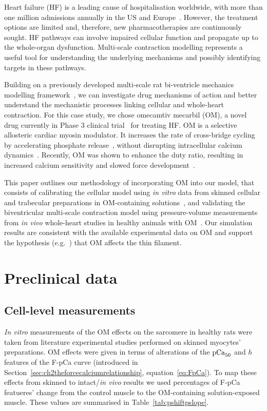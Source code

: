 \vspace{0.2cm}
Heart failure (HF) is a leading cause of hospitalisation worldwide, with more than one million admissions annually in the US and Europe~\cite{Benjamin:2018}. However, the treatment options are limited and, therefore, new pharmacotherapies are continuously sought. HF pathways can involve impaired cellular function and propagate up to the whole-organ dysfunction. Multi-scale contraction modelling represents a useful tool for understanding the underlying mechanisms and possibly identifying targets in these pathways.

Building on a previously developed multi-scale rat bi-ventricle mechanics modelling framework~\cite{Longobardi:2020}, we can investigate drug mechanisms of action and better understand the mechanistic processes linking cellular and whole-heart contraction. For this case study, we chose omecamtiv mecarbil (OM), a novel drug currently in Phase $3$ clinical trial~\cite{Teerlink:2021} for treating HF. OM is a selective allosteric cardiac myosin modulator. It increases the rate of cross-bridge cycling by accelerating phosphate release~\cite{Malik:2011}, without disrupting intracellular calcium dynamics~\cite{Horvath:2017}. Recently, OM was shown to enhance the duty ratio, resulting in increased calcium sensitivity and slowed force development~\cite{Swenson:2017, Kampourakis:2018}.

This paper outlines our methodology of incorporating OM into our model, that consists of calibrating the cellular model using \textit{in vitro} data from skinned cellular and trabecular preparations in OM-containing solutions~\cite{Nagy:2015,Kampourakis:2018,Kieu:2019}, and validating the biventricular multi-scale contraction model using pressure-volume measurements from \textit{in vivo} whole-heart studies in healthy animals with OM~\cite{Bakkehaug:2015}. Our simulation results are consistent with the available experimental data on OM and support the hypothesis (e.g.~\cite{Swenson:2017}) that OM affects the thin filament.

%
%
%
\section{Preclinical data}\label{sec:ch5preclinicaldata}

%
%
%
\subsection{Cell-level measurements}\label{sec:ch5celllevelmeasurements}
\textit{In vitro} measurements of the OM effects on the sarcomere in healthy rats were taken from literature experimental studies performed on skinned myocytes' preparations. OM effects were given in terms of alterations of the $\textrm{pCa}_{50}$ and $h$ features of the F-pCa curve (introduced in Section~\ref{sec:ch2theforcecalciumrelationship}, equation~\eqref{eq:FpCa}). To map these effects from skinned to intact/\textit{in vivo} results we used percentages of F-pCa featueres' change from the control muscle to the OM-containing solution-exposed muscle. These values are summarised in Table~\ref{tab:pshiftpslope}.

